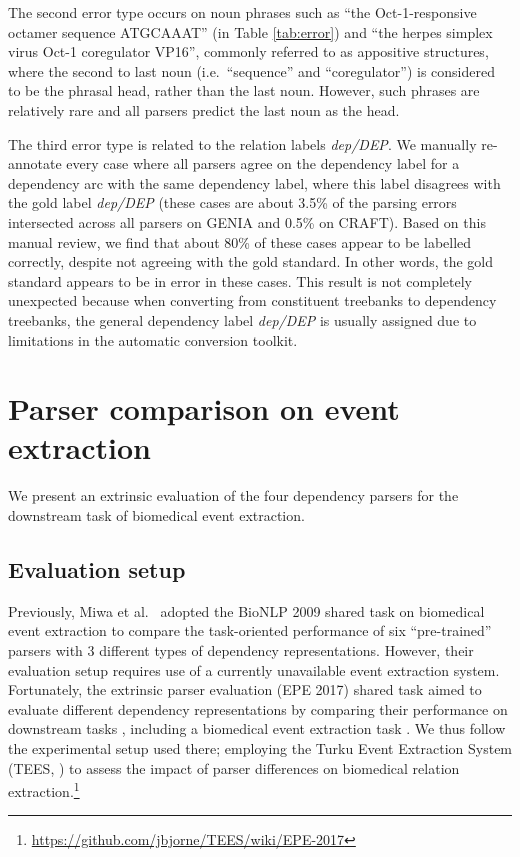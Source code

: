 \documentclass[twocolumn,hyperref]{bmcart}\pdfoutput=1
\newcommand{\CHANGEA}[1]{#1}
\begin{document}
The second error type occurs on noun phrases such as ``the Oct-1-responsive octamer sequence ATGCAAAT''  \CHANGEA{(in Table  \ref{tab:error})} and ``the herpes simplex virus Oct-1 coregulator VP16'', \CHANGEA{commonly referred to as appositive structures,} where the second to last noun (i.e.\ ``sequence'' and ``coregulator'') is considered to be the phrasal head, rather than the last noun. However, such phrases are relatively rare and all parsers predict the last noun as the head.  

\CHANGEA{The third error type is related to the relation labels   \textit{dep/DEP}. We manually re-annotate every case where all parsers agree on the dependency label for a dependency arc with the same dependency label, where this label disagrees with the gold label \textit{dep/DEP}
(these cases are about 3.5\% of the parsing errors intersected across all parsers on GENIA  and 0.5\% on CRAFT). Based on this manual review, we find that about 80\% of these cases appear to be labelled correctly, despite not agreeing with the gold standard. In other words, the gold standard appears to be in error in these cases.
This result is not completely unexpected because when converting from constituent treebanks to dependency treebanks, the general dependency label \textit{dep/DEP} is usually assigned due to  limitations in the automatic conversion toolkit.}



\section*{Parser comparison on event extraction}
We present an extrinsic evaluation of the four dependency parsers for the downstream task of biomedical event extraction.
\subsection*{Evaluation setup}
Previously, Miwa et al.\ \cite{miwa2010} adopted the BioNLP 2009 shared task on biomedical event extraction \cite{BioNLP2009} to compare the task-oriented performance of six ``pre-trained'' parsers with  3 different types of dependency representations. 
However, their evaluation setup requires use of  
a currently unavailable event extraction system.  
Fortunately, the extrinsic parser evaluation (EPE 2017)  shared task  aimed to evaluate different dependency representations by comparing their performance on downstream tasks \cite{epe2017}, including a biomedical event extraction  task   \cite{epe2017bio}.  
We thus follow the experimental setup used there;  employing the Turku Event Extraction System (TEES, \cite{bjorne-EtAl:2009:BioNLP-ST}) to assess the impact of parser differences on biomedical relation extraction.\footnote{{\url{https://github.com/jbjorne/TEES/wiki/EPE-2017}}}
\end{document}
